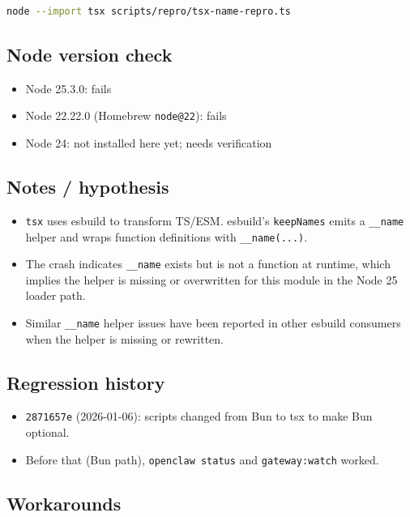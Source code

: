 \begin{lstlisting}[language=bash]
node --import tsx scripts/repro/tsx-name-repro.ts
\end{lstlisting}


\subsection{Node version check}


\begin{itemize}
  \item Node 25.3.0: fails
  \item Node 22.22.0 (Homebrew \texttt{node@22}): fails
  \item Node 24: not installed here yet; needs verification
\end{itemize}


\subsection{Notes / hypothesis}


\begin{itemize}
  \item \texttt{tsx} uses esbuild to transform TS/ESM. esbuild’s \texttt{keepNames} emits a \texttt{\_\_name} helper and wraps function definitions with \texttt{\_\_name(...)}.
  \item The crash indicates \texttt{\_\_name} exists but is not a function at runtime, which implies the helper is missing or overwritten for this module in the Node 25 loader path.
  \item Similar \texttt{\_\_name} helper issues have been reported in other esbuild consumers when the helper is missing or rewritten.
\end{itemize}


\subsection{Regression history}


\begin{itemize}
  \item \texttt{2871657e} (2026-01-06): scripts changed from Bun to tsx to make Bun optional.
  \item Before that (Bun path), \texttt{openclaw status} and \texttt{gateway:watch} worked.
\end{itemize}


\subsection{Workarounds}


